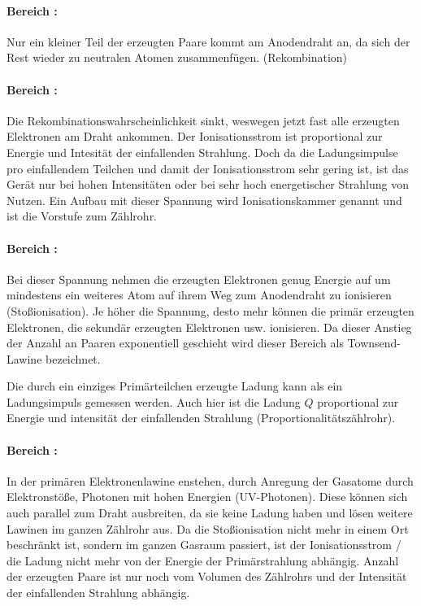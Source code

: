 \documentclass[titlepage = firstcover]{scrartcl}
\newcommand{\RN}[1]{\uppercase\expandafter{\romannumeral#1}}
\begin{document}
          \paragraph{Bereich \RN{1}:}
            Nur ein kleiner Teil der erzeugten Paare kommt am Anodendraht an, da sich der Rest wieder zu neutralen Atomen zusammenfügen. (Rekombination)

          \paragraph{Bereich \RN{2}:}
            Die Rekombinationswahrscheinlichkeit sinkt, weswegen jetzt fast alle erzeugten Elektronen am Draht ankommen. Der Ionisationsstrom ist proportional zur Energie und Intesität der einfallenden Strahlung. Doch da die Ladungsimpulse pro einfallendem Teilchen und damit der Ionisationsstrom sehr gering ist, ist das Gerät nur bei hohen Intensitäten oder bei sehr hoch energetischer Strahlung von Nutzen. Ein Aufbau mit dieser Spannung wird Ionisationskammer genannt und ist die Vorstufe zum Zählrohr.

          \paragraph{Bereich \RN{3}:}
            Bei dieser Spannung nehmen die erzeugten Elektronen genug Energie auf um mindestens ein weiteres Atom auf ihrem Weg zum Anodendraht zu ionisieren (Stoßionisation). Je höher die Spannung, desto mehr können die primär erzeugten Elektronen, die sekundär erzeugten Elektronen usw. ionisieren. Da dieser Anstieg der Anzahl an Paaren exponentiell geschieht wird dieser Bereich als Townsend-Lawine bezeichnet.

            Die durch ein einziges Primärteilchen erzeugte Ladung kann als ein Ladungsimpuls gemessen werden. Auch hier ist die Ladung $Q$ proportional zur Energie und intensität der einfallenden Strahlung (Proportionalitätszählrohr).

          \paragraph{Bereich \RN{4}:}
            In der primären Elektronenlawine enstehen, durch Anregung der Gasatome durch Elektronstöße, Photonen mit hohen Energien (UV-Photonen). Diese können sich auch parallel zum Draht ausbreiten, da sie keine Ladung haben und lösen weitere Lawinen im ganzen Zählrohr aus. Da die Stoßionisation nicht mehr in einem Ort beschränkt ist, sondern im ganzen Gasraum passiert, ist der Ionisationsstrom / die Ladung nicht mehr von der Energie der Primärstrahlung abhängig. Anzahl der erzeugten Paare ist nur noch vom Volumen des Zählrohrs und der Intensität der einfallenden Strahlung abhängig.
\end{document}
